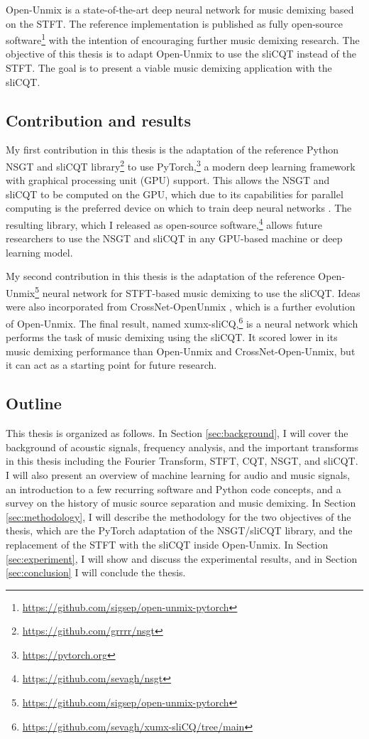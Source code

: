 \documentclass[report.tex]{subfiles}
\begin{document}
Open-Unmix \parencite{umx} is a state-of-the-art deep neural network for music demixing based on the STFT. The reference implementation is published as fully open-source software\footnote{\url{https://github.com/sigsep/open-unmix-pytorch}} with the intention of encouraging further music demixing research. The objective of this thesis is to adapt Open-Unmix to use the sliCQT instead of the STFT. The goal is to present a viable music demixing application with the sliCQT.

\subsection{Contribution and results}

My first contribution in this thesis is the adaptation of the reference Python NSGT and sliCQT library\footnote{\url{https://github.com/grrrr/nsgt}} to use PyTorch,\footnote{\url{https://pytorch.org}} a modern deep learning framework with graphical processing unit (GPU) support. This allows the NSGT and sliCQT to be computed on the GPU, which due to its capabilities for parallel computing is the preferred device on which to train deep neural networks \parencite{pytorch}. The resulting library, which I released as open-source software,\footnote{\url{https://github.com/sevagh/nsgt}} allows future researchers to use the NSGT and sliCQT in any GPU-based machine or deep learning model.

My second contribution in this thesis is the adaptation of the reference Open-Unmix\footnote{\url{https://github.com/sigsep/open-unmix-pytorch}} neural network for STFT-based music demixing \parencite{umx} to use the sliCQT. Ideas were also incorporated from CrossNet-OpenUnmix \parencite{xumx}, which is a further evolution of Open-Unmix. The final result, named xumx-sliCQ,\footnote{\url{https://github.com/sevagh/xumx-sliCQ/tree/main}} is a neural network which performs the task of music demixing using the sliCQT. It scored lower in its music demixing performance than Open-Unmix and CrossNet-Open-Unmix, but it can act as a starting point for future research.

\subsection{Outline}

This thesis is organized as follows. In Section \ref{sec:background}, I will cover the background of acoustic signals, frequency analysis, and the important transforms in this thesis including the Fourier Transform, STFT, CQT, NSGT, and sliCQT. I will also present an overview of machine learning for audio and music signals, an introduction to a few recurring software and Python code concepts, and a survey on the history of music source separation and music demixing. In Section \ref{sec:methodology}, I will describe the methodology for the two objectives of the thesis, which are the PyTorch adaptation of the NSGT/sliCQT library, and the replacement of the STFT with the sliCQT inside Open-Unmix. In Section \ref{sec:experiment}, I will show and discuss the experimental results, and in Section \ref{sec:conclusion} I will conclude the thesis.
\end{document}
